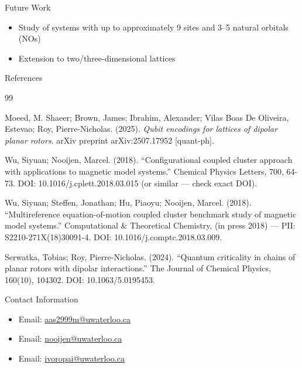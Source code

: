 \documentclass[final]{beamer}
\newlength{\onecolwid}
\begin{document}
\begin{frame}[t]
\begin{columns}[t]
\begin{column}{\onecolwid}
\begin{block}{Future Work}
\begin{itemize}
  \item Study of systems with up to approximately 9 sites
        and 3–5 natural orbitals (NOs)

  \item Extension to two/three-dimensional lattices
\end{itemize}

\end{block}


\begin{block}{References}
    \small
    
    \begin{thebibliography}{99}

    Moeed, M. Shaeer; Brown, James; Ibrahim, Alexander; Vilas Boas De Oliveira, Estevao; Roy, Pierre-Nicholas. (2025).
    \emph{Qubit encodings for lattices of dipolar planar rotors}.
    arXiv preprint arXiv:2507.17952 [quant-ph].

    Wu, Siyuan; Nooijen, Marcel. (2018).
    “Configurational coupled cluster approach with applications to magnetic model systems.”
    Chemical Physics Letters, 700, 64-73. DOI: 10.1016/j.cplett.2018.03.015 (or similar — check exact DOI).

    Wu, Siyuan; Steffen, Jonathan; Hu, Piaoyu; Nooijen, Marcel. (2018).
    “Multireference equation-of-motion coupled cluster benchmark study of magnetic model systems.”
    Computational \& Theoretical Chemistry, (in press 2018) — PII: S2210-271X(18)30091-4. DOI: 10.1016/j.comptc.2018.03.009.

    Serwatka, Tobias; Roy, Pierre-Nicholas. (2024).
    “Quantum criticality in chains of planar rotors with dipolar interactions.”
    The Journal of Chemical Physics, 160(10), 104302. DOI: 10.1063/5.0195453.

    \end{thebibliography}
\end{block}



\begin{alertblock}{Contact Information}
    \begin{itemize}
    \item Email: \href{mailto:aas2999m@uwaterloo.ca}{aas2999m@uwaterloo.ca}
    \item Email: \href{mailto:nooijen@uwaterloo.ca}{nooijen@uwaterloo.ca}
    \item Email: \href{mailto:ivoropai@uwaterloo.ca}{ivoropai@uwaterloo.ca}
    \end{itemize}
\end{alertblock}


\end{column}
\end{columns}
\end{frame}
\end{document}
